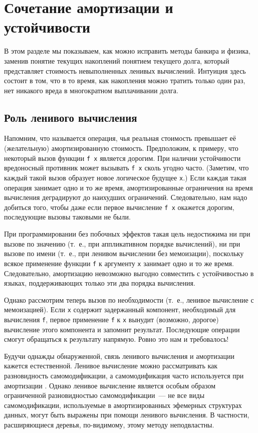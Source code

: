 \section{Сочетание амортизации и устойчивости}
\label{sc:6.2}

В этом разделе мы показываем, как можно исправить методы банкира и
физика, заменив понятие текущих накоплений понятием текущего долга,
который представляет стоимость невыполненных ленивых
вычислений. Интуиция здесь состоит в том, что в то время, как
накопления можно тратить только один раз, нет никакого вреда в
многократном выплачивании долга.

\subsection{Роль ленивого вычисления}
\label{sc:6.2.1}

Напомним, что  называется операция, чья
реальная стоимость превышает её (желательную) амортизированную
стоимость. Предположим, к примеру, что некоторый вызов функции
\lstinline!f x!
является дорогим. При наличии устойчивости вредоносный противник может
вызывать \lstinline!f x! сколь угодно часто. (Заметим, что каждый
такой вызов образует новое логическое будущее \lstinline!x!.) Если
каждая такая операция занимает одно и то же время, амортизированные
ограничения на время вычисления деградируют до наихудших
ограничений. Следовательно, нам надо добиться того, чтобы даже если
первое вычисление \lstinline!f x! окажется дорогим, последующие вызовы
таковыми не были.

При программировании без побочных эффектов такая цель недостижима ни
при вызове по значению (т.~е., при аппликативном порядке вычислений),
ни при вызове по имени (т.~е., при ленивом вычислении без мемоизации),
поскольку всякое применение функции \lstinline!f! к аргументу
\lstinline!x! занимает одно и то же время. Следовательно, амортизацию
невозможно выгодно совместить с устойчивостью в языках, поддерживающих
только эти два порядка вычисления.

Однако рассмотрим теперь вызов по необходимости (т.~е., ленивое
вычисление с мемоизацией). Если \lstinline!x! содержит задержанный
компонент, необходимый для вычисления \lstinline!f!, первое применение
\lstinline!f! к \lstinline!x! вынудит (возможно, дорогое) вычисление
этого компонента и запомнит результат. Последующие операции смогут
обращаться к результату напрямую. Ровно это нам и требовалось!

\begin{remark}
  Будучи однажды обнаруженной, связь ленивого вычисления и амортизации
  кажется естественной. Ленивое вычисление можно рассматривать как
  разновидность самомодификации, а самомодификация часто используется
  при амортизации \cite{SleatorTarjan1985, SleatorTarjan1986b}. Однако
  ленивое вычисление является особым образом ограниченной
  разновидностью самомодификации~--- не все виды самомодификации,
  используемые в амортизированных эфемерных структурах данных, могут
  быть выражены при помощи ленивого вычисления. В частности,
  расширяющиеся деревья, по-видимому, этому методу неподвластны.
\end{remark}
